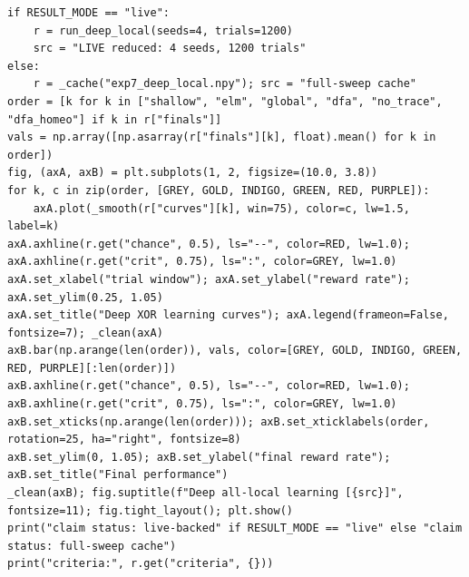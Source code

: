 \begin{lstlisting}[caption={03\_deep\_local\_learning.ipynb code cell 2},label={lst:mrl-nb-03-deep-local-learning-2}]
if RESULT_MODE == "live":
    r = run_deep_local(seeds=4, trials=1200)
    src = "LIVE reduced: 4 seeds, 1200 trials"
else:
    r = _cache("exp7_deep_local.npy"); src = "full-sweep cache"
order = [k for k in ["shallow", "elm", "global", "dfa", "no_trace", "dfa_homeo"] if k in r["finals"]]
vals = np.array([np.asarray(r["finals"][k], float).mean() for k in order])
fig, (axA, axB) = plt.subplots(1, 2, figsize=(10.0, 3.8))
for k, c in zip(order, [GREY, GOLD, INDIGO, GREEN, RED, PURPLE]):
    axA.plot(_smooth(r["curves"][k], win=75), color=c, lw=1.5, label=k)
axA.axhline(r.get("chance", 0.5), ls="--", color=RED, lw=1.0); axA.axhline(r.get("crit", 0.75), ls=":", color=GREY, lw=1.0)
axA.set_xlabel("trial window"); axA.set_ylabel("reward rate"); axA.set_ylim(0.25, 1.05)
axA.set_title("Deep XOR learning curves"); axA.legend(frameon=False, fontsize=7); _clean(axA)
axB.bar(np.arange(len(order)), vals, color=[GREY, GOLD, INDIGO, GREEN, RED, PURPLE][:len(order)])
axB.axhline(r.get("chance", 0.5), ls="--", color=RED, lw=1.0); axB.axhline(r.get("crit", 0.75), ls=":", color=GREY, lw=1.0)
axB.set_xticks(np.arange(len(order))); axB.set_xticklabels(order, rotation=25, ha="right", fontsize=8)
axB.set_ylim(0, 1.05); axB.set_ylabel("final reward rate"); axB.set_title("Final performance")
_clean(axB); fig.suptitle(f"Deep all-local learning [{src}]", fontsize=11); fig.tight_layout(); plt.show()
print("claim status: live-backed" if RESULT_MODE == "live" else "claim status: full-sweep cache")
print("criteria:", r.get("criteria", {}))
\end{lstlisting}

